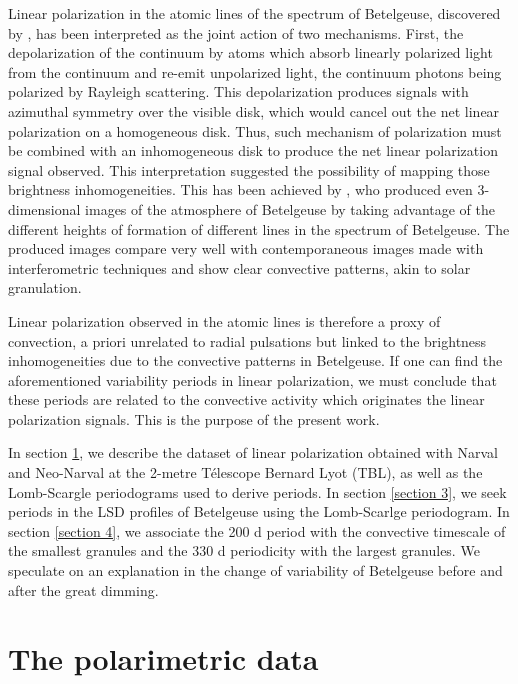 \documentclass{aa}
\begin{document}
Linear polarization in the atomic lines of the spectrum of Betelgeuse, discovered by \cite{auriere_discovery_2016}, has been interpreted as the joint action of 
two mechanisms. First, the depolarization of the continuum by atoms which absorb linearly polarized light from the continuum and re-emit unpolarized light,
the continuum photons being polarized by Rayleigh scattering. This depolarization produces signals with azimuthal symmetry over the visible disk, which would  cancel out the net linear polarization on a homogeneous disk. Thus, such mechanism of polarization must be combined with an inhomogeneous disk to produce the net linear polarization 
signal observed. This interpretation suggested the possibility of mapping those brightness inhomogeneities. This has been achieved by \cite{lopez_ariste_convective_2018}, who produced even 3-dimensional images of the atmosphere of Betelgeuse \citep{lopez_ariste_three-dimensional_2022} by taking advantage of the different heights of formation of 
different lines in the spectrum of Betelgeuse. The produced images compare very well with contemporaneous images made with interferometric 
techniques \citep{montarges_close_2016} and show clear convective patterns, akin to solar granulation.\

Linear polarization observed in the atomic lines is therefore a proxy of convection, a priori unrelated to radial 
pulsations but linked to the brightness inhomogeneities due to the convective patterns in Betelgeuse. If one can find the aforementioned variability periods 
in linear polarization, we must conclude that these periods are related to the convective activity which originates the linear polarization signals.
This is the purpose of the present work.\

In section \ref{Section 2}, we describe the dataset of linear polarization obtained with Narval and Neo-Narval at the 2-metre T\'elescope Bernard Lyot (TBL), as well as the Lomb-Scargle periodograms used to derive periods. In section \ref{section 3}, we seek periods in the LSD profiles of Betelgeuse using the Lomb-Scarlge periodogram. In section \ref{section 4}, we associate the 200 d period with the convective timescale of the smallest granules and the 330 d periodicity with the largest granules. We speculate on an explanation in the change of variability of Betelgeuse before and after the great dimming. 


\section{The polarimetric data}
\label{Section 2}
\end{document}
